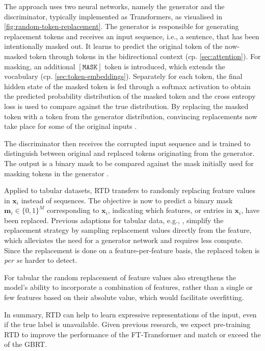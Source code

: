 The approach uses two neural networks, namely the generator and the discriminator, typically implemented as Transformers, as visualised in \cref{fig:random-token-replacement}.  The generator is responsible for generating replacement tokens and receives an input sequence, i.e., a sentence, that has been intentionally masked out. It learns to predict the original token of the now-masked token through tokens in the bidirectional context (cp. \cref{sec:attention}). For masking, an additional $\mathtt{[MASK]}$ token is introduced, which extends the vocabulary (cp. \cref{sec:token-embeddings}). Separately for each token, the final hidden state of the masked token is fed through a softmax activation to obtain the predicted probability distribution of the masked token and the cross entropy loss is used to compare against the true distribution. By replacing the masked token with a token from the generator distribution, convincing replacements now take place for some of the original inputs \autocite[][2--3]{clarkElectraPretrainingText2020}.

The discriminator then receives the corrupted input sequence and is trained to distinguish between original and replaced tokens originating from the generator. The output is a binary mask to be compared against the mask initially used for masking tokens in the generator \autocite[][2--3]{clarkElectraPretrainingText2020}.

Applied to tabular datasets, \gls{RTD} transfers to randomly replacing feature values in $\mathbf{x}_{i}$ instead of sequences. The objective is now to predict a binary mask $\mathbf{m}_{i}\in \{0,1\}^{M}$ corresponding to $\mathbf{x}_{i}$, indicating which features, or entries in $\mathbf{x}_{i}$, have been replaced. Previous adaptions for tabular data, e.g., \textcite[][3]{huangTabTransformerTabularData2020}, simplify the replacement strategy by sampling replacement values directly from the feature, which alleviates the need for a generator network and requires less compute. Since the replacement is done on a feature-per-feature basis, the replaced token is \emph{per se} harder to detect.

For tabular the random replacement of feature values also strengthens the model's ability to incorporate a combination of features, rather than a single or few features based on their absolute value, which would facilitate overfitting.

In summary, \gls{RTD} can help to learn expressive representations of the input, even if the true label is unavailable. Given previous research, we expect pre-training \gls{RTD} to improve the performance of the FT-Transformer and match or exceed the of the \gls{GBRT}.


